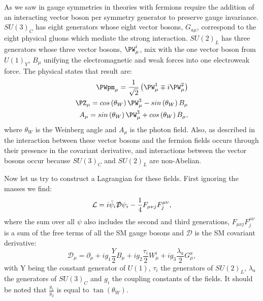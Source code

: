 As we saw in  gauge symmetries in theories with fermions require the addition of an interacting vector boson per symmetry generator to preserve gauge invariance. $SU\left(3\right)_{C}$ has eight generators whose eight vector bosons, $G_{a\mu}$, correspond to the eight physical gluons which mediate the strong interaction. $SU\left(2\right)_{L}$ has three generators whose three vector bosons, $\PW^{i}_{\mu}$, mix with the one vector boson from $U\left(1\right)_{Y}$, $B_{\mu}$ unifying the electromagnetic and weak forces into one electroweak force. The physical states that result are:
\begin{equation}
  \begin{split}
  \PWpm_{\mu}=\frac{1}{\sqrt{2}}\left(\PW^{1}_{\mu}\mp i\PW^{2}_{\mu}\right) \\
  \PZ_{\mu}=cos\left(\theta_{W}\right)\PW^{3}_{\mu}-sin\left(\theta_{W}\right)B_{\mu} \\
  A_{\mu}=sin\left(\theta_{W}\right)\PW^{3}_{\mu}+cos\left(\theta_{W}\right)B_{\mu},
  \end{split}
\end{equation}
where $\theta_{W}$ is the Weinberg angle and $A_{\mu}$ is the photon field. Also, as described in  the interaction between these vector bosons and the fermion fields occurs through their presence in the covariant derivative, and interactions between the vector bosons occur because $SU\left(3\right)_{C}$ and $SU\left(2\right)_{L}$ are non-Abelian.

Now let us try to construct a Lagrangian for these fields. First ignoring the masses we find:
\begin{equation}
  \mathcal{L}=i\bar{\psi}_{i}\slashed{\mathcal{D}}\psi_{i}-\frac{1}{4}F_{\mu\nu j}F^{\mu\nu}_{j},
\end{equation}
where the sum over all $\psi$ also includes the second and third generations, $F_{\mu\nu j}F^{\mu\nu}_{j}$ is a sum of the free terms of all the SM gauge bosons and $\mathcal{D}$ is the SM covariant derivative:
\begin{equation}
  \mathcal{D_{\mu}}=\partial_{\mu}+ig_{1}\frac{Y}{2}B_{\mu}+ig_{2}\frac{\tau_{i}}{2}W_{\mu}^{i}+ig_{3}\frac{\lambda_{a}}{2}G_{\mu}^{a},
\end{equation}
with Y being the constant generator of $U\left(1\right)$, $\tau_{i}$ the generators of $SU\left(2\right)_{L}$, $\lambda_{a}$ the generators of $SU\left(3\right)_{C}$ and $g_{i}$ the coupling constants of the fields. It should be noted that $\frac{g_{1}}{g_{2}}$ is equal to $\tan\left(\theta_{W}\right)$.

